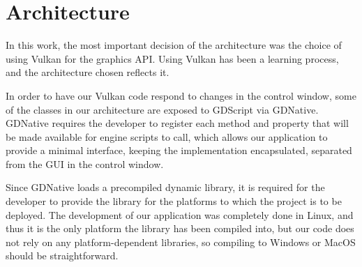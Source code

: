 \section{Architecture}
In this work, the most important decision of the architecture was the choice of using Vulkan for the graphics API. Using Vulkan has been a learning process, and the architecture chosen reflects it.

In order to have our Vulkan code respond to changes in the control window, some of the classes in our architecture are exposed to GDScript via GDNative. GDNative requires the developer to register each method and property that will be made available for engine scripts to call, which allows our application to provide a minimal interface, keeping the implementation encapsulated, separated from the GUI in the control window.

Since GDNative loads a precompiled dynamic library, it is required for the developer to provide the library for the platforms to which the project is to be deployed. The development of our application was completely done in Linux, and thus it is the only platform the library has been compiled into, but our code does not rely on any platform-dependent libraries, so compiling to Windows or MacOS should be straightforward.












